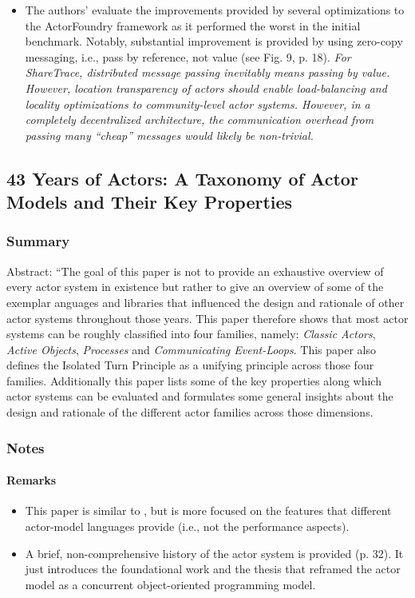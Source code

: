 \begin{itemize}
\begin{enumerate}
	\end{enumerate}
\item The authors' evaluate the improvements provided by several optimizations to the ActorFoundry framework as it performed the worst in the initial benchmark. Notably, substantial improvement is provided by using zero-copy messaging, i.e., pass by reference, not value (see Fig. 9, p. 18). \emph{For ShareTrace, distributed message passing inevitably means passing by value. However, location transparency of actors should enable load-balancing and locality optimizations to community-level actor systems. However, in a completely decentralized architecture, the communication overhead from passing many ``cheap'' messages would likely be non-trivial.}
\end{itemize}

\subsection{43 Years of Actors: A Taxonomy of Actor Models and Their Key Properties}
\subsubsection*{Summary}
Abstract: ``The goal of this paper is not to provide an exhaustive overview of every actor system in existence but rather to give an overview of some of the exemplar anguages and libraries that influenced the design and rationale of other actor systems throughout those years. This paper therefore shows that most actor systems can be roughly classified into four families, namely: \emph{Classic Actors}, \emph{Active Objects}, \emph{Processes} and \emph{Communicating Event-Loops}. This paper also defines the Isolated Turn Principle as a unifying principle across those four families. Additionally this paper lists some of the key properties along which actor systems can be evaluated and formulates some general insights about the design and rationale of the different actor families across those dimensions.
\subsubsection*{Notes}
\paragraph{Remarks}
\begin{itemize}
\item This paper is similar to \cite{Karmani2009}, but is more focused on the features that different actor-model languages provide (i.e., not the performance aspects).
\item A brief, non-comprehensive history of the actor system is provided (p. 32). It just introduces the foundational work \cite{Hewitt1977b} and the thesis \cite{Agha1985} that reframed the actor model as a concurrent object-oriented programming model.
\end{itemize}

